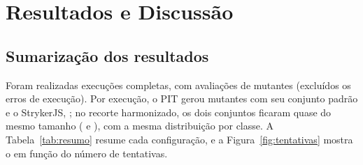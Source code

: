 \section{Resultados e Discussão}

\subsection{Sumarização dos resultados}

Foram realizadas \totalExecucoes{} execuções completas, com \totalAvaliacoes{} avaliações de mutantes (excluídos os erros de execução). Por execução, o PIT gerou \gerJavaFracaCem{} mutantes com seu conjunto padrão e o StrykerJS, \gerNodeFracaCem; no recorte harmonizado, os dois conjuntos ficaram quase do mesmo tamanho (\gerhJavaFracaCem{} e \gerhNodeFracaCem), com a mesma distribuição por classe. A Tabela~\ref{tab:resumo} resume cada configuração, e a Figura~\ref{fig:tentativas} mostra o \ms{} em função do número de tentativas.

